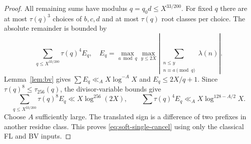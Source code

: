 \documentclass[11pt]{article}
\theoremstyle{definition}
\theoremstyle{remark}
\numberwithin{equation}{section}
\begin{document}
\begin{proof}
All remaining sums have modulus $q=q_0d\le X^{33/200}$.
For fixed $q$ there are at most $\tau(q)^3$ choices of $b,c,d$ and at most $\tau(q)$ root classes per choice.
The absolute remainder is bounded by
\begin{equation}\label{eq:soft-grouped-bv}
 \sum_{q\le X^{33/200}}\tau(q)^4E_q,
 \quad E_q=\max_{a\bmod q}\max_{y\le2X}\left|\sum_{\substack{n\le y\\n\equiv a\pmod q}}\lambda(n)\right|.
\end{equation}
Lemma~\ref{lem:bv} gives $\sum E_q\ll_A X\log^{-A}X$ and $E_q\le2X/q+1$.
Since $\tau(q)^8\le\tau_{256}(q)$, the divisor-variable bounds give
\begin{equation}\label{eq:soft-bv-cauchy}
 \sum_{q\le X^{33/200}}\tau(q)^8E_q\ll X\log^{256}(2X),\qquad
 \sum\tau(q)^4E_q\ll_A X\log^{128-A/2}X.
\end{equation}
Choose $A$ sufficiently large. The translated sign is a difference of two prefixes in another residue class.
This proves \eqref{eq:soft-single-cancel} using only the classical FL and BV inputs.
\end{proof}
\end{document}
